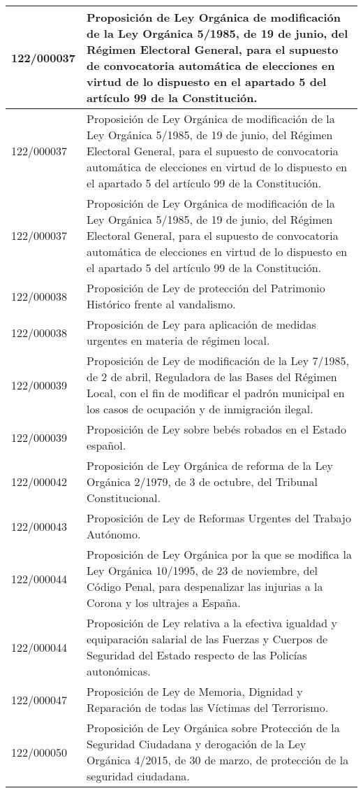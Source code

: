 {\begin{table}[H]
\begin{center}
\begin{tabularx}{\linewidth}{| l | X |}
\hline
122/000037 & Proposición de Ley Orgánica de modificación de la Ley Orgánica 5/1985, de 19 de junio, del Régimen Electoral General, para el supuesto de convocatoria automática de elecciones en virtud de lo dispuesto en el apartado 5 del artículo 99 de la Constitución. \\
\hline
122/000037 & Proposición de Ley Orgánica de modificación de la Ley Orgánica 5/1985, de 19 de junio, del Régimen Electoral General, para el supuesto de convocatoria automática de elecciones en virtud de lo dispuesto en el apartado 5 del artículo 99 de la Constitución. \\
\hline
122/000037 & Proposición de Ley Orgánica de modificación de la Ley Orgánica 5/1985, de 19 de junio, del Régimen Electoral General, para el supuesto de convocatoria automática de elecciones en virtud de lo dispuesto en el apartado 5 del artículo 99 de la Constitución. \\
\hline
122/000038 & Proposición de Ley de protección del Patrimonio Histórico frente al vandalismo. \\
\hline
122/000038 & Proposición de Ley para aplicación de medidas urgentes en materia de régimen local. \\
\hline
122/000039 & Proposición de Ley de modificación de la Ley 7/1985, de 2 de abril, Reguladora de las Bases del Régimen Local, con el fin de modificar el padrón municipal en los casos de ocupación y de inmigración ilegal. \\
\hline
122/000039 & Proposición de Ley sobre bebés robados en el Estado español. \\
\hline
122/000042 & Proposición de Ley Orgánica de reforma de la Ley Orgánica 2/1979, de 3 de octubre, del Tribunal Constitucional. \\
\hline
122/000043 & Proposición de Ley de Reformas Urgentes del Trabajo Autónomo. \\
\hline
122/000044 & Proposición de Ley Orgánica por la que se modifica la Ley Orgánica 10/1995, de 23 de noviembre, del Código Penal, para despenalizar las injurias a la Corona y los ultrajes a España. \\
\hline
122/000044 & Proposición de Ley relativa a la efectiva igualdad y equiparación salarial de las Fuerzas y Cuerpos de Seguridad del Estado respecto de las Policías autonómicas. \\
\hline
122/000047 & Proposición de Ley de Memoria, Dignidad y Reparación de todas las Víctimas del Terrorismo. \\
\hline
122/000050 & Proposición de Ley Orgánica sobre Protección de la Seguridad Ciudadana y derogación de la Ley Orgánica 4/2015, de 30 de marzo, de protección de la seguridad ciudadana. \\

\end{tabularx}
\end{center}
\end{table}}
